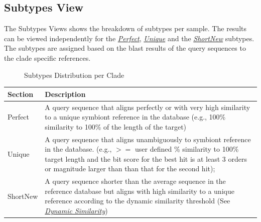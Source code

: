 \documentclass[letterpaper,10pt,english]{sphinxmanual}
\begin{document}
\subsection{Subtypes View}
\label{Web:subtypes-view}
The Subtypes Views shows the breakdown of subtypes per sample. The results
can be viewed independently for the {\hyperref[defs:perfect]{\emph{Perfect}}}, {\hyperref[defs:unique]{\emph{Unique}}} and the
{\hyperref[defs:shortnew]{\emph{ShortNew}}} subtypes. The subtypes are assigned based on the blast results of the query sequences to
the clade specific references.
\begin{figure}[htbp]
\centering
\capstart

\caption{Subtypes Distribution per Clade}\end{figure}

\begin{tabulary}{\linewidth}{|p{2cm}|p{13cm}|}
\hline
\textsf{\relax 
Section
} & \textsf{\relax 
Description
}\\
\hline
Perfect
 & 
A query sequence that aligns perfectly or with very high similarity to a unique symbiont reference in the database (e.g., 100\% similarity to 100\% of the length of the target)
\\

Unique
 & 
A query sequence that aligns unambiguously to symbiont reference in the database. (e.g., \(>=\) user defined \% similarity to 100\% target length and the bit score for the best hit is at least 3 orders or magnitude larger than than that for the second hit);
\\

ShortNew
 & 
A query sequence shorter than the average sequence in the reference database but aligns with high similarity to a unique reference according to the dynamic similarity threshold (See {\hyperref[defs:dynamic-similarity]{\emph{Dynamic Similarity}}})
\\
\hline\end{tabulary}
\end{document}
